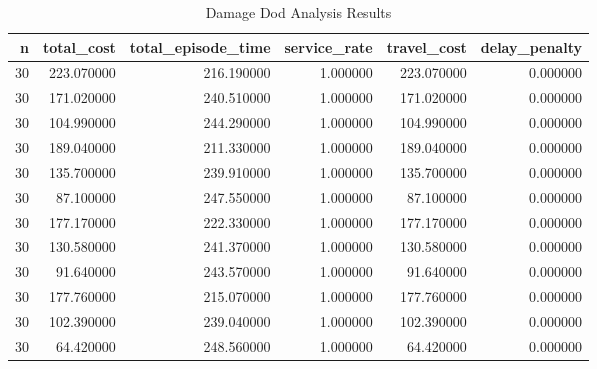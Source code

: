 \begin{table}
\caption{Damage Dod Analysis Results}
\begin{tabular}{rrrrrr}
\toprule
n & total_cost & total_episode_time & service_rate & travel_cost & delay_penalty \\
\midrule
30 & 223.070000 & 216.190000 & 1.000000 & 223.070000 & 0.000000 \\
30 & 171.020000 & 240.510000 & 1.000000 & 171.020000 & 0.000000 \\
30 & 104.990000 & 244.290000 & 1.000000 & 104.990000 & 0.000000 \\
30 & 189.040000 & 211.330000 & 1.000000 & 189.040000 & 0.000000 \\
30 & 135.700000 & 239.910000 & 1.000000 & 135.700000 & 0.000000 \\
30 & 87.100000 & 247.550000 & 1.000000 & 87.100000 & 0.000000 \\
30 & 177.170000 & 222.330000 & 1.000000 & 177.170000 & 0.000000 \\
30 & 130.580000 & 241.370000 & 1.000000 & 130.580000 & 0.000000 \\
30 & 91.640000 & 243.570000 & 1.000000 & 91.640000 & 0.000000 \\
30 & 177.760000 & 215.070000 & 1.000000 & 177.760000 & 0.000000 \\
30 & 102.390000 & 239.040000 & 1.000000 & 102.390000 & 0.000000 \\
30 & 64.420000 & 248.560000 & 1.000000 & 64.420000 & 0.000000 \\
\bottomrule
\end{tabular}
\end{table}
